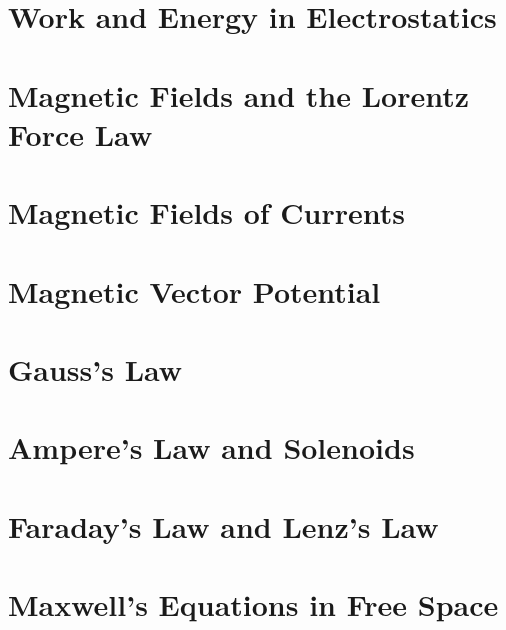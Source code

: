\documentclass[
  letterpaper,
  DIV=11,
  numbers=noendperiod]{scrreprt}
\begin{document}

\chapter{Work and Energy in
Electrostatics}\label{work-and-energy-in-electrostatics}


\chapter{Magnetic Fields and the Lorentz Force
Law}\label{magnetic-fields-and-the-lorentz-force-law}


\chapter{Magnetic Fields of Currents}\label{magnetic-fields-of-currents}


\chapter{Magnetic Vector Potential}\label{magnetic-vector-potential}


\chapter{Gauss's Law}\label{gausss-law}


\chapter{Ampere's Law and Solenoids}\label{amperes-law-and-solenoids}


\chapter{Faraday's Law and Lenz's Law}\label{faradays-law-and-lenzs-law}


\chapter{Maxwell's Equations in Free
Space}\label{maxwells-equations-in-free-space}
\end{document}
